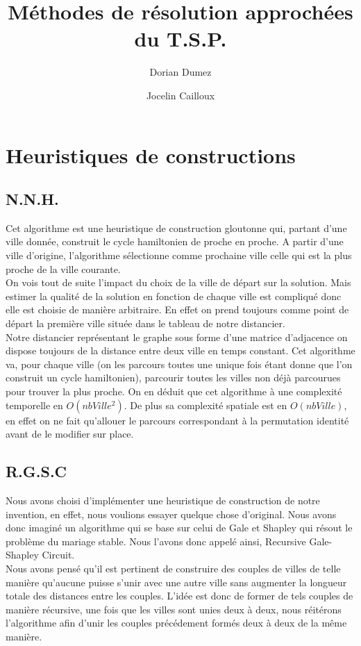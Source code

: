 \documentclass[12pt,a4paper]{article}
\title{Méthodes de résolution approchées du T.S.P.}
\author{Dorian Dumez \and Jocelin Cailloux}
\begin{document}
\maketitle
\section{Heuristiques de constructions}
\subsection{N.N.H.}
Cet algorithme est une heuristique de construction gloutonne qui, partant d'une ville donnée, construit le cycle hamiltonien de proche en proche. A partir d'une ville d'origine, l'algorithme sélectionne comme prochaine ville celle qui est la plus proche de la ville courante.\\

On vois tout de suite l'impact du choix de la ville de départ sur la solution. Mais estimer la qualité de la solution en fonction de chaque ville est compliqué donc elle est choisie de manière arbitraire. En effet on prend toujours comme point de départ la première ville située dans le tableau de notre distancier.\\

Notre distancier représentant le graphe sous forme d'une matrice d'adjacence on dispose toujours de la distance entre deux ville en temps constant. Cet algorithme va, pour chaque ville (on les parcours toutes une unique fois étant donne que l'on construit un cycle hamiltonien), parcourir toutes les villes non déjà parcourues pour trouver la plus proche. On en déduit que cet algorithme à une complexité temporelle en $O(nbVille^2)$. De plus sa complexité spatiale est en $O(nbVille)$, en effet on ne fait qu’allouer le parcours correspondant à la permutation identité avant de le modifier sur place.\\

\subsection{R.G.S.C}
Nous avons choisi d'implémenter une heuristique de construction de notre invention, en effet, nous voulions essayer quelque chose d'original. Nous avons donc imaginé un algorithme qui se base sur celui de Gale et Shapley qui résout le problème du mariage stable. Nous l'avons donc appelé ainsi, Recursive Gale-Shapley Circuit.\\

Nous avons pensé qu'il est pertinent de construire des couples de villes de telle manière qu'aucune puisse s'unir avec une autre ville sans augmenter la longueur totale des distances entre les couples. L'idée est donc de former de tels couples de manière récursive, une fois que les villes sont unies deux à deux, nous réitérons l'algorithme afin d'unir les couples précédement formés deux à deux de la même manière.\\
\end{document}
